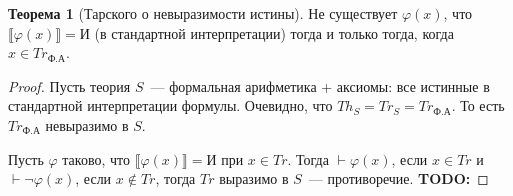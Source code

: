 \documentclass[a4paper,11pt]{article}
\theoremstyle{definition}
\newtheorem*{thm}{Теорема}
\newcommand{\proves}{\vdash}
\newcommand{\True}{\text{И}}
\newcommand{\todo}[1]{\textbf{TODO:} #1}
\begin{document}
\begin{thm}[Тарского о невыразимости истины]
Не существует $\varphi(x)$, что $\llbracket\varphi(x)\rrbracket = \True$ (в
стандартной интерпретации) тогда и только тогда, когда $x \in Tr_{\text{Ф.А}}$.
\end{thm}
\begin{proof}
Пусть теория $S$~--- формальная арифметика + аксиомы: все истинные в
стандартной интерпретации формулы. Очевидно, что $Th_S = Tr_S = Tr_{\text{Ф.А}}$.
То есть $Tr_{\text{Ф.А}}$ невыразимо в $S$.

Пусть $\varphi$ таково, что $\llbracket\varphi(x)\rrbracket = \True$ при $x \in
Tr$. Тогда $\proves \varphi(x)$, если $x \in Tr$ и $\proves \neg\varphi(x)$,
если $x \notin Tr$, тогда $Tr$ выразимо в $S$~--- противоречие. \todo{}
\end{proof}
\end{document}
